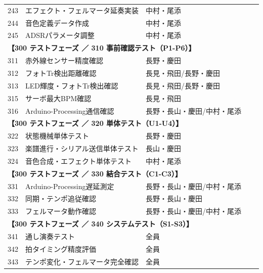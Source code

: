 \begin{longtable}{p{0.9cm}p{7cm}p{2.5cm}p{2cm}p{2cm}}
243 & エフェクト・フェルマータ延奏実装 & 中村・尾添 &  &  \\
244 & 音色定義データ作成 & 中村・尾添 &  &  \\
245 & ADSRパラメータ調整 & 中村・尾添 &  &  \\
\midrule
\multicolumn{5}{l}{\textbf{【300 テストフェーズ ／ 310 事前確認テスト（P1-P6）】}} \\
\midrule
311 & 赤外線センサー精度確認 & 長野・慶田 &  &  \\
312 & フォトTr検出距離確認 & 長見・飛田/長野・慶田 &  &  \\
313 & LED輝度・フォトTr検出確認 & 長見・飛田/長野・慶田 &  &  \\
315 & サーボ最大BPM確認 & 長見・飛田 &  &  \\
316 & Arduino-Processing通信確認 & 長野・長山・慶田/中村・尾添 &  &  \\
\midrule
\multicolumn{5}{l}{\textbf{【300 テストフェーズ ／ 320 単体テスト（U1-U4）】}} \\
\midrule
322 & 状態機械単体テスト & 長野・慶田 &  &  \\
323 & 楽譜進行・シリアル送信単体テスト & 長山・慶田 &  &  \\
324 & 音色合成・エフェクト単体テスト & 中村・尾添 &  &  \\
\midrule
\multicolumn{5}{l}{\textbf{【300 テストフェーズ ／ 330 結合テスト（C1-C3）】}} \\
\midrule
331 & Arduino-Processing遅延測定 & 長野・長山・慶田/中村・尾添 &  &  \\
332 & 同期・テンポ追従確認 & 長野・長山・慶田 &  &  \\
333 & フェルマータ動作確認 & 長野・長山・慶田/中村・尾添 &  &  \\
\midrule
\multicolumn{5}{l}{\textbf{【300 テストフェーズ ／ 340 システムテスト（S1-S3）】}} \\
\midrule
341 & 通し演奏テスト & 全員 &  &  \\
342 & 拍タイミング精度評価 & 全員 &  &  \\
343 & テンポ変化・フェルマータ完全確認 & 全員 &  &  \\
\midrule

\end{longtable}
\endgroup
